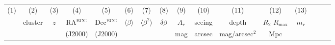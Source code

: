 \documentclass[useAMS,usenatbib]{mnras}
\begin{document}
\begin{table}
\begin{tabular*}{1.0\textwidth}{ l l c c c r c c c c c c c c c c }
\multicolumn{1}{c}{(1) } & \multicolumn{1}{c}{ (2) } & \multicolumn{1}{c}{ (3) } & \multicolumn{1}{c}{ (4) } & \multicolumn{1}{c}{ (5) } &  \multicolumn{1}{c}{ (6) } & \multicolumn{1}{c}{ (7) } & \multicolumn{1}{c}{ (8) } &  \multicolumn{1}{c}{ (9) } & \multicolumn{1}{c}{ (10) } & \multicolumn{1}{c}{ (11) } & \multicolumn{1}{c}{ (12) } & \multicolumn{1}{c}{ (13) }  \\

\multicolumn{1}{c}{ } & \multicolumn{1}{c}{ cluster} & \multicolumn{1}{c}{ $z$} &  \multicolumn{1}{c}{ RA$^{\mathrm{BCG}}$} & \multicolumn{1}{c}{ Dec$^{\mathrm{BCG}}$} & \multicolumn{1}{c}{ $\langle \beta \rangle$} &  \multicolumn{1}{c}{ $\langle \beta^2 \rangle$} & \multicolumn{1}{c}{ $\delta \beta$} & \multicolumn{1}{c}{ $A_r$} & \multicolumn{1}{c}{seeing}  & \multicolumn{1}{c}{ depth} & \multicolumn{1}{c}{$R_2$-$R_\mathrm{max}$} & \multicolumn{1}{c}{$m_r$} \\
 &  & & (J2000) & \multicolumn{1}{c}{(J2000)}  &  &  &  &  mag & arcsec & mag/arcsec$^2$  & Mpc & \\
 

\end{tabular*}
\end{table}
\end{document}
